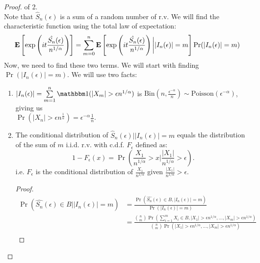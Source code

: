 \documentclass[../main/main.tex]{subfiles}
\begin{document}
\begin{proof} of 2.\\

	Note that $\hat{S}_n(\epsilon)$ is a sum of a random number of r.v. We will find the characteristic function using the total law of expectation:
	\begin{align*}
		\text{\textbf{E}} \left[ \exp \left( it \frac{\hat{S_n}(\epsilon)}{n^{1 / \alpha}} \right)  \right]= \sum\limits_{m=0}^{n} \text{\textbf{E}} \left[ \exp \left( it \frac{\hat{S_n}(\epsilon)}{n^{1 / \alpha}} \right) \bigg| |I_n(\epsilon)| = m \right] \Pr(|I_n(\epsilon)| = m)
	\end{align*}
	Now, we need to find these two terms. We will start with finding $\Pr(|I_n(\epsilon)| = m)$. We will use two facts:
	\begin{enumerate}
		\item $|I_n(\epsilon)|  = \sum\limits_{m=1}^{n}\ind(|X_m|>\epsilon n ^{1 / \alpha})$ is $\text{Bin} \left( n , \frac{\epsilon^{-\alpha}}{n} \right)\sim \text{Poisson}(\epsilon^{-\alpha})$, giving us\\ $\Pr(|X_n|>\epsilon n^{\frac{1}{\alpha}}) = \epsilon^{-\alpha} \frac{1}{n}$.
		\item The conditional distribution of $\hat{S}_n(\epsilon)\bigg\vert |I_n(\epsilon)|=m$ equals the distribution of the sum of $m$ i.i.d. r.v. with c.d.f. $F_{\epsilon}$ defined as: \[
			      1-F_{\epsilon}(x) = \Pr \left( \frac{X_1}{n^{1 / \alpha}} > x \bigg\vert \frac{|X_1|}{n^{1 / \alpha}}>\epsilon\right).
		      \]
		      i.e. $F_{\epsilon}$ is the conditional distribution of $\frac{X_1}{n^{1 / \alpha}}$ given $\frac{|X_1|}{n^{1 / \alpha}}>\epsilon$.
		      \begin{proof}
			      \begin{align*}
				      \Pr(\hat{S_n}(\epsilon)\in B \big| |I_n(\epsilon)| = m) & =  \frac{\Pr(\hat{S_n}(\epsilon)\in B , |I_n(\epsilon)| = m)}{\Pr(|I_n(\epsilon)| = m)}                                                                                                                                                                  \\
				                                                              & = \frac{\binom{n}{m}\Pr \left( \sum\limits_{i=1}^{m}X_i \in B, |X_1| > \epsilon n^{1 / \alpha},\ldots, |X_m| > \epsilon n^{1 / \alpha}  \right)}{\binom{n}{m}\Pr \left(|X_1| > \epsilon n^{1 / \alpha},\ldots, |X_m| > \epsilon n^{1 / \alpha}  \right)} \\
			      \end{align*}
		      \end{proof}

\end{enumerate}
\end{proof}
\end{document}
